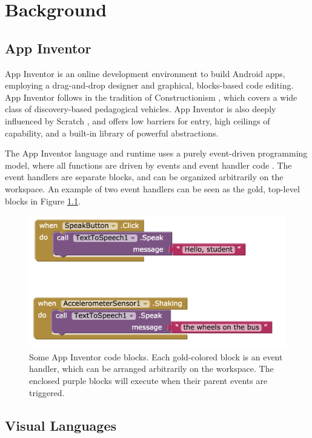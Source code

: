 \chapter{Background}
\label{chap:background}

\section{App Inventor}
\label{sec:app-inventor-background}
App Inventor is an online development environment to build Android apps, employing a drag-and-drop designer and graphical, blocks-based code editing. App Inventor follows in the tradition of Constructionism \citep{papert1991situating}, which covers a wide class of discovery-based pedagogical vehicles. App Inventor is also deeply influenced by Scratch \citep{resnick2009scratch}, and offers low barriers for entry, high ceilings of capability, and a built-in library of powerful abstractions.

The App Inventor language and runtime uses a purely event-driven programming model, where all functions are driven by events and event handler code \citep{turbak-2014}. The event handlers are separate blocks, and can be organized arbitrarily on the workspace. An example of two event handlers can be seen as the gold, top-level blocks in Figure \ref{fig:debug0ch2}. 

\begin{figure}
  \centering
      \includegraphics[width=\textwidth]{images/debugActivity/debug0start}
  \caption[Some App Inventor code blocks]{Some App Inventor code blocks. Each gold-colored block is an event handler, which can be arranged arbitrarily on the workspace. The enclosed purple blocks will execute when their parent events are triggered.}
  \label{fig:debug0ch2}
\end{figure}

\section{Visual Languages}
\label{sec:visual-languages}

